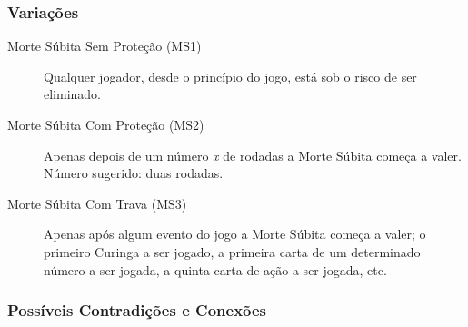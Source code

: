 \subsubsection{Variações}

\begin{description}
\item[Morte Súbita Sem Proteção (MS1)]{Qualquer jogador, desde o princípio do jogo, está sob o risco de ser eliminado.}
\item[Morte Súbita Com Proteção (MS2)]{Apenas depois de um número \textit{x} de rodadas a Morte Súbita começa a valer. Número sugerido: duas rodadas.}
\item[Morte Súbita Com Trava (MS3)]{Apenas após algum evento do jogo a Morte Súbita começa a valer; o primeiro Curinga a ser jogado, a primeira carta de um determinado número a ser jogada, a quinta carta de ação a ser jogada, etc.}
\end{description}

\subsubsection{Possíveis Contradições e Conexões}

